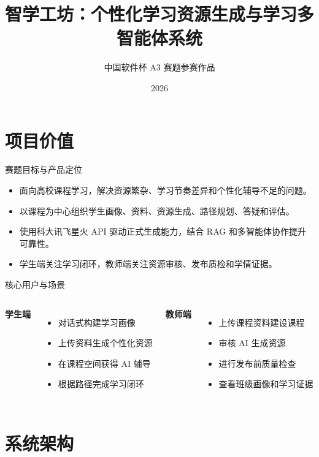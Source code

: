 \documentclass{beamer}
\title{智学工坊：个性化学习资源生成与学习多智能体系统}
\author{中国软件杯 A3 赛题参赛作品}
\institute{合肥工业大学}
\date{2026}
\begin{document}
\begin{frame}
  \maketitle
\end{frame}

\section{项目价值}

\begin{frame}{赛题目标与产品定位}
\begin{itemize}
  \item 面向高校课程学习，解决资源繁杂、学习节奏差异和个性化辅导不足的问题。
  \item 以课程为中心组织学生画像、资料、资源生成、路径规划、答疑和评估。
  \item 使用科大讯飞星火 API 驱动正式生成能力，结合 RAG 和多智能体协作提升可靠性。
  \item 学生端关注学习闭环，教师端关注资源审核、发布质检和学情证据。
\end{itemize}
\end{frame}

\begin{frame}{核心用户与场景}
\begin{columns}
\textbf{学生端}
\begin{itemize}
  \item 对话式构建学习画像
  \item 上传资料生成个性化资源
  \item 在课程空间获得 AI 辅导
  \item 根据路径完成学习闭环
\end{itemize}
\textbf{教师端}
\begin{itemize}
  \item 上传课程资料建设课程
  \item 审核 AI 生成资源
  \item 进行发布前质量检查
  \item 查看班级画像和学习证据
\end{itemize}
\end{columns}
\end{frame}

\section{系统架构}
\end{document}
